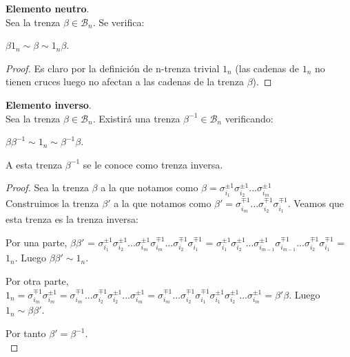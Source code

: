\begin{pro}  \textbf{Elemento neutro}.\label{prodneutro}\\
	Sea la trenza $\beta \in \mathscr{B}_{n}$. Se verifica:
	\begin{center}
		 $\beta 1_{n} \sim \beta \sim 1_{n} \beta$.
	\end{center}
	
	\begin{proof}	
		Es claro por la definición de n-trenza trivial $ 1_{n} $ (las cadenas de $ 1_{n} $ no tienen cruces luego no afectan a las cadenas de la trenza $ \beta $). 
	\end{proof}
\end{pro}

\begin{pro}  \textbf{Elemento inverso}.\label{prodinverso}\\
	Sea la trenza $\beta \in \mathscr{B}_{n}$. Existirá una trenza $\beta^{-1} \in \mathscr{B}_{n}$ verificando:
	\begin{center}
		$\beta \beta^{-1} \sim 1_{n} \sim \beta^{-1} \beta$.
	\end{center}
	A esta trenza $\beta^{-1}$ se le conoce como trenza inversa.
	
	\begin{proof} 
		Sea la trenza $\beta$ a la que notamos como $\beta = \sigma_{i_{1}}^{\pm 1} \sigma_{i_{2}}^{\pm 1} ... \sigma_{i_{m}}^{\pm 1}$\\

		 Construimos la trenza $\beta'$ a la que notamos como $\beta' = \sigma_{i_{m}}^{\mp 1} ...\sigma_{i_{2}}^{\mp 1} \sigma_{i_{1}}^{\mp 1}$. Veamos que esta trenza es la trenza inversa:
			\begin{center}
			 Por una parte, $\beta \beta'$ = $\sigma_{i_{1}}^{\pm 1} \sigma_{i_{2}}^{\pm 1} ... \sigma_{i_{m}}^{\pm 1} \sigma_{i_{m}}^{\mp 1} ...\sigma_{i_{2}}^{\mp 1} \sigma_{i_{1}}^{\mp 1}$ = $\sigma_{i_{1}}^{\pm 1} \sigma_{i_{2}}^{\pm 1} ... \sigma_{i_{m-1}}^{\pm 1} \sigma_{i_{m-1}}^{\mp 1} ...\sigma_{i_{2}}^{\mp 1} \sigma_{i_{1}}^{\mp 1}$ = $ 1_{n} $. Luego $\beta \beta' \sim 1_{n}$.\\
			\end{center}		 
			\begin{center}
			 Por otra parte, $ 1_{n} = \sigma_{i_{m}}^{\mp 1} \sigma_{i_{m}}^{\pm 1} = \sigma_{i_{m}}^{\mp 1} ...\sigma_{i_{2}}^{\mp 1} \sigma_{i_{2}}^{\pm 1} ... \sigma_{i_{m}}^{\pm 1} = \sigma_{i_{m}}^{\mp 1} ...\sigma_{i_{2}}^{\mp 1} \sigma_{i_{1}}^{\mp 1} \sigma_{i_{1}}^{\pm 1} \sigma_{i_{2}}^{\pm 1} ... \sigma_{i_{m}}^{\pm 1} = \beta' \beta$. Luego $1_{n} \sim \beta \beta'$.\\
			\end{center}
		 Por tanto $\beta' = \beta^{-1}$.\\
		 

\end{proof}
\end{pro}
